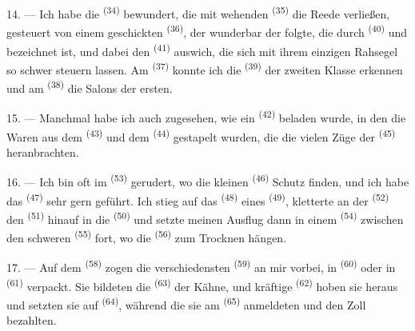 \VUsaut{4.0mm}
\VUsaut{3.0mm}

14. --- Ich habe die  \textsuperscript{(34)} bewundert, die mit
wehenden  \textsuperscript{(35)} die Reede verließen, gesteuert von
einem geschickten  \textsuperscript{(36)}, der wunderbar der
 folgte, die durch  \textsuperscript{(40)} und
 bezeichnet ist, und dabei den 
\textsuperscript{(41)} auswich, die sich mit ihrem einzigen Rahsegel so schwer
steuern lassen. Am  \textsuperscript{(37)} konnte ich die
 \textsuperscript{(39)} der zweiten Klasse erkennen und am
 \textsuperscript{(38)} die Salons der ersten.

15. --- Manchmal habe ich auch zugesehen, wie ein 
\textsuperscript{(42)} beladen wurde, in den die Waren aus dem 
\textsuperscript{(43)} und dem  \textsuperscript{(44)} gestapelt
wurden, die die vielen Züge der  \textsuperscript{(45)}
heranbrachten.

\VUsaut{3.0mm}
\VUsaut{3.0mm}

16. --- Ich bin oft im  \textsuperscript{(53)} gerudert, wo die
kleinen  \textsuperscript{(46)} Schutz finden, und ich habe das
 \textsuperscript{(47)} sehr gern geführt. Ich stieg auf das
 \textsuperscript{(48)} eines 
\textsuperscript{(49)}, kletterte an der  \textsuperscript{(52)} den
 \textsuperscript{(51)} hinauf in die 
\textsuperscript{(50)} und setzte meinen Ausflug dann in einem 
\textsuperscript{(54)} zwischen den schweren 
\textsuperscript{(55)} fort, wo die  \textsuperscript{(56)} zum Trocknen
hängen.

17. --- Auf dem  \textsuperscript{(58)} zogen die verschiedensten
 \textsuperscript{(59)} an mir vorbei, in 
\textsuperscript{(60)} oder in  \textsuperscript{(61)} verpackt. Sie
bildeten die  \textsuperscript{(63)} der Kähne, und kräftige
 \textsuperscript{(62)} hoben sie heraus und setzten sie auf
 \textsuperscript{(64)}, während die  sie am
 \textsuperscript{(65)} anmeldeten und den Zoll bezahlten.

